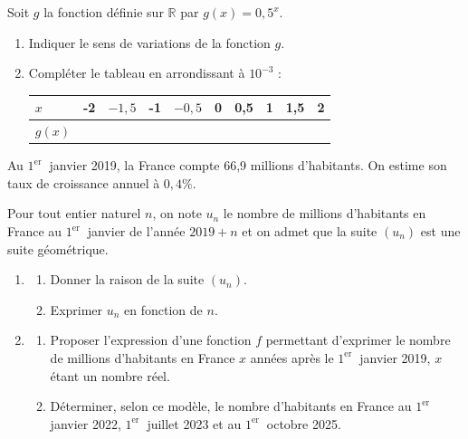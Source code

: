 \documentclass[french]{book}
\begin{document}
\begin{exocor}
Soit $g$ la fonction définie sur $\mathbb{R}$ par $g(x)=0,5^{x}$.

\begin{enumerate}
\item Indiquer le sens de variations de la fonction $g$.

\item Compléter le tableau en arrondissant à $10^{-3}$ :

\begin{center}
\begin{tabular}{|l|l|l|l|l|l|l|l|l|l|}
\hline$x$ & -2 & $-1,5$ & -1 & $-0,5$ & 0 & 0,5 & 1 & 1,5 & 2 \\
\hline$g(x)$ & & & & & & & & & \\
\hline

\end{tabular}
\end{center}
\end{enumerate}
\end{exocor}

\begin{exocor}
Au $1^{\text {er }}$ janvier 2019, la France compte 66,9 millions d'habitants. On estime son taux de croissance annuel à $0,4 \%$.

Pour tout entier naturel $n$, on note $u_{n}$ le nombre de millions d'habitants en France au $1^{\text {er }}$ janvier de l'année $2019+n$ et on admet que la suite $\left(u_{n}\right)$ est une suite géométrique.

\begin{enumerate}
\item 
\begin{enumerate}
\item Donner la raison de la suite $\left(u_{n}\right)$.
\item Exprimer $u_{n}$ en fonction de $n$.
\end{enumerate}

\item 
\begin{enumerate}
\item Proposer l'expression d'une fonction $f$ permettant d'exprimer le nombre de millions d'habitants en France $x$ années après le $1^{\text {er }}$ janvier 2019, $x$ étant un nombre réel.

\item Déterminer, selon ce modèle, le nombre d'habitants en France au $1^{\text {er }}$ janvier 2022, $1^{\text {er }}$ juillet 2023 et au $1^{\text {er }}$ octobre 2025.
\end{enumerate}

\end{enumerate}
\end{exocor}
\end{document}
